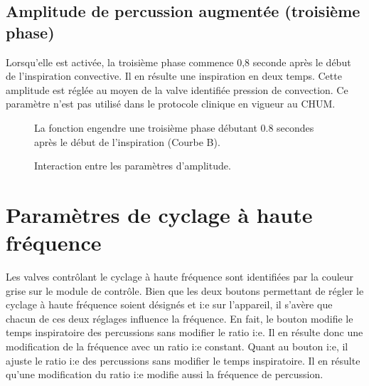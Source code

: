 \subsection{Amplitude de percussion augmentée (troisième phase)}

Lorsqu'elle est activée, la troisième phase commence 0,8 seconde après
	le début de l'inspiration convective. Il en résulte une inspiration
	en deux temps. Cette amplitude est réglée au moyen de la valve
	identifiée pression de convection. Ce paramètre n'est pas utilisé
	dans le protocole clinique en vigueur au CHUM.

\begin{figure}
	
	\caption[Augmentation de la pression de convection]{La fonction
	 engendre une
	troisième phase débutant 0.8 secondes après le début de
	l'inspiration (Courbe B).}
\end{figure}


\begin{figure} \centering 
\caption{Interaction entre les paramètres d'amplitude.}
\label{figinterampl} \end{figure}

\section{Paramètres de cyclage à haute fréquence}

Les valves contrôlant le cyclage à haute fréquence sont identifiées
	par la couleur grise sur le module de contrôle.  Bien que les deux
	boutons permettant de régler le cyclage à haute fréquence soient
	désignés  et  i:e sur
	l'appareil, il s'avère que chacun de ces deux  réglages
	influence la fréquence.  En fait, le bouton  modifie le temps inspiratoire des percussions sans
	modifier le ratio i:e. Il en résulte donc une modification de la
	fréquence avec un ratio i:e constant.  Quant au bouton 
	i:e, il ajuste le ratio i:e des percussions sans modifier le temps
	inspiratoire. Il en résulte qu’une modification du ratio i:e modifie
	aussi la fréquence de percussion.


